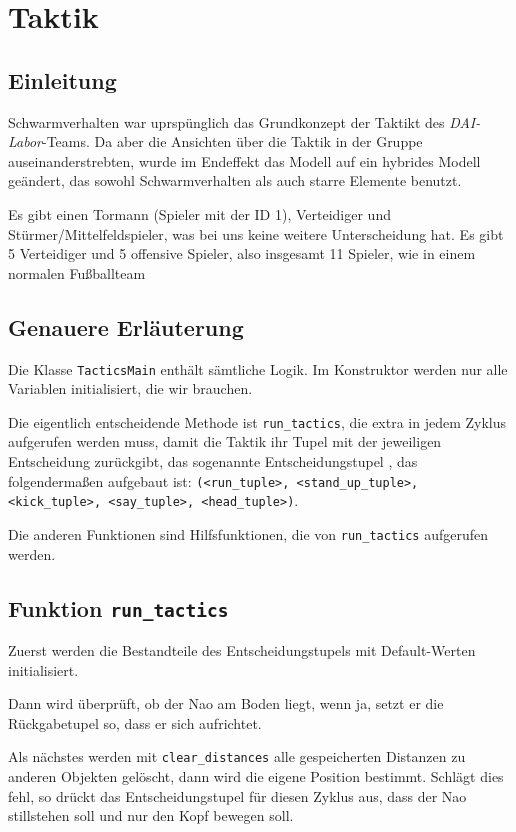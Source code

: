 \section{Taktik}

\subsection{Einleitung}

Schwarmverhalten war uprspünglich das Grundkonzept der Taktikt des \textit{DAI-Labor}-Teams. Da aber die Ansichten über die Taktik in der Gruppe auseinanderstrebten, wurde im Endeffekt das Modell auf ein hybrides Modell geändert, das sowohl Schwarmverhalten als auch starre Elemente benutzt. 

Es gibt einen Tormann (Spieler mit der ID 1), Verteidiger und Stürmer/Mittelfeldspieler, was bei uns keine weitere Unterscheidung hat. Es gibt 5 Verteidiger und 5 offensive Spieler, also insgesamt 11 Spieler, wie in einem normalen Fußballteam

\subsection{Genauere Erläuterung}

Die Klasse \texttt{TacticsMain} enthält sämtliche Logik. Im Konstruktor werden nur alle Variablen initialisiert, die wir brauchen.

Die eigentlich entscheidende Methode ist \texttt{run\_tactics}, die extra in jedem Zyklus aufgerufen werden muss, damit die Taktik ihr Tupel mit der jeweiligen Entscheidung zurückgibt, das sogenannte \glqq Entscheidungstupel \grqq, das folgendermaßen aufgebaut ist: \texttt{(<run\_tuple>, <stand\_up\_tuple>, <kick\_tuple>, <say\_tuple>, <head\_tuple>)}. 

Die anderen Funktionen sind Hilfsfunktionen, die von \texttt{run\_tactics} aufgerufen werden. 

\subsection{Funktion \texttt{run\_tactics}}
Zuerst werden die Bestandteile des \glqq Entscheidungstupels \grqq mit Default-Werten initialisiert. 

Dann wird überprüft, ob der Nao am Boden liegt, wenn ja, setzt er die Rückgabetupel so, dass er sich aufrichtet.

Als nächstes werden mit \texttt{clear\_distances} alle gespeicherten Distanzen zu anderen Objekten gelöscht, dann wird die eigene Position bestimmt. Schlägt dies fehl, so drückt das \glqq Entscheidungstupel \grqq für diesen Zyklus aus, dass der Nao stillstehen soll und nur den Kopf bewegen soll.

